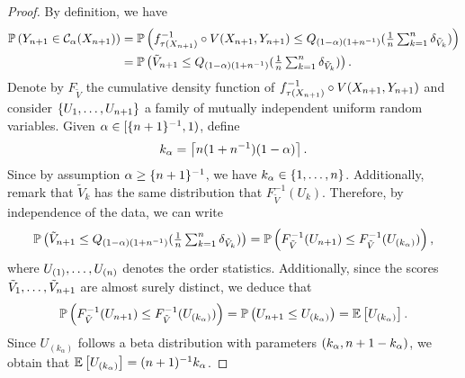 \begin{proof}
  By definition, we have
  \begin{align}
    \mathbb{P}\left({Y_{n+1} \in \mathcal{C}_{\alpha}(X_{n+1})}\right)
    &= \mathbb{P}\left({ f_{\tau(X_{n+1})}^{-1}\circ V(X_{n+1},Y_{n+1}) \le Q_{(1-\alpha)(1+n^{-1})} ({\textstyle{\frac{1}{n} \sum_{k=1}^{n} \delta_{\tilde{V}_k}}})}\right)
    \\
    &= \mathbb{P}\left({\tilde{V}_{n+1} \le Q_{(1-\alpha)(1+n^{-1})} ({\textstyle{\frac{1}{n} \sum_{k=1}^{n} \delta_{\tilde{V}_k}}})}\right).
  \end{align}
  Denote by $F_{\tilde{V}}$ the cumulative density function of $f_{\tau(X_{n+1})}^{-1}\circ V(X_{n+1},Y_{n+1})$ and consider $\{U_{1},\ldots,U_{n+1}\}$ a family of mutually independent uniform random variables.
  Given $\alpha\in[\{n+1\}^{-1},1)$, define
  \begin{equation*}
    k_{\alpha}
    = \left\lceil n (1+n^{-1}) (1-\alpha) \right\rceil.
  \end{equation*}
  Since by assumption $\alpha\ge \{n+1\}^{-1}$, we have $k_{\alpha}\in\{1,\ldots,n\}$.
  Additionally, remark that $\tilde{V}_k$ has the same distribution that $F_{\tilde{V}}^{-1}(U_k)$.
  Therefore, by independence of the data, we can write
  \begin{equation*}
    \mathbb{P}\left({\tilde{V}_{n+1} \le Q_{(1-\alpha)(1+n^{-1})} ({\textstyle{\frac{1}{n} \sum_{k=1}^{n} \delta_{\tilde{V}_k}}})}\right)
    = \mathbb{P}\left({F_{\tilde{V}}^{-1}(U_{n+1}) \le F_{\tilde{V}}^{-1}(U_{(k_\alpha)})}\right),
  \end{equation*}
  where $U_{(1)},\ldots,U_{(n)}$ denotes the order statistics.
  Additionally, since the scores $\tilde{V}_1,\ldots,\tilde{V}_{n+1}$ are almost surely distinct, we deduce that
  \begin{equation*}
    \mathbb{P}\left({F_{\tilde{V}}^{-1}(U_{n+1}) \le F_{\tilde{V}}^{-1}(U_{(k_\alpha)})}\right)
    = \mathbb{P}\left({U_{n+1} \le U_{(k_\alpha)}}\right)
    = \mathbb{E}\left[{U_{(k_\alpha)}}\right].
  \end{equation*}
  Since $U_{(k_\alpha)}$ follows a beta distribution with parameters $(k_\alpha, n+1-k_{\alpha})$, we obtain that $\mathbb{E}\left[{U_{(k_\alpha)}}\right]=(n+1)^{-1} k_\alpha$.
\end{proof}
